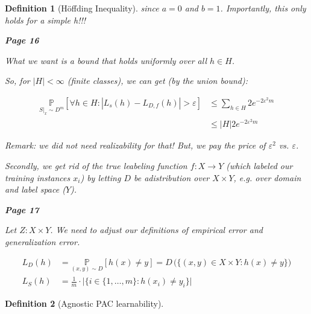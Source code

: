 \documentclass{scrarticle}
\newtheorem{definition}{Definition}[section]
\begin{document}
\begin{definition}[Höffding Inequality]
since $a=0$ and $b=1$. Importantly, this only holds for a simple h!!!

\textbf{Page 16}

What we want is a bound that holds uniformly over all $h\in H$.

So, for $|H| < \infty$ (finite classes), we can get (by the union bound):

\begin{align*}
    \underset{S|_x \sim D^m}{\mathbb{P}}[\forall h \in H: |L_s(h)-L_{D,f}(h)|>\varepsilon] &\leq \sum_{h \in H} 2e^{-2\varepsilon^2m}\\   
    &\leq |H|2e^{-2\varepsilon^2m}
\end{align*}

Remark: we did not need realizability for that! But, we pay the price of $\varepsilon^2$ vs. $\varepsilon$.

Secondly, we get rid of the true leabeling function $f:X \to Y$ (which labeled our training instances $x_i$) by letting $D$ be adistribution over $X \times Y$, e.g. over domain and label space ($Y$).

\textbf{Page 17}

Let $Z:X \times Y$. We need to adjust our definitions of empirical error and generalization error. 

\begin{align*}
    L_D(h) &= \underset{(x,y) \sim D}{\mathbb{P}}[h(x) \neq y] = D\, \big ( \{(x,y) \in X \times Y: h(x) \neq y\} \big )\\
    L_S(h) &= \frac{1}{m} \cdot \bigl| \big \{i \in \{1, \ldots, m\}: h(x_i) \neq y_i\big \} \bigr |
\end{align*}

\end{definition}

\begin{definition}[Agnostic PAC learnability]
    
\end{definition}
\end{document}
